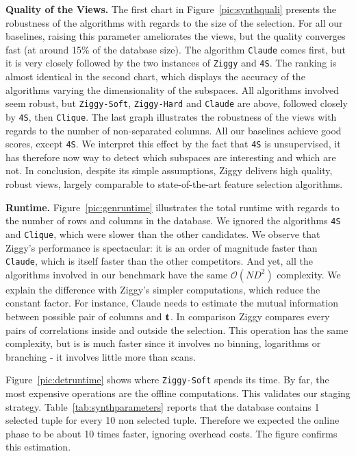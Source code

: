 \textbf{Quality of the Views.} The first chart in Figure~\ref{pic:synthquali}
presents the robustness of the algorithms with regards to the size of the
selection. For all our baselines, raising this parameter ameliorates the views, 
but the quality converges fast (at around 15\% of the database size).  The
algorithm \texttt{Claude} comes first, but it is very closely followed by the
two instances of \texttt{Ziggy} and \texttt{4S}. The ranking is almost
identical in the second chart, which displays the accuracy of the algorithms
varying the dimensionality of the subspaces. All algorithms involved seem
robust, but \texttt{Ziggy-Soft}, \texttt{Ziggy-Hard} and \texttt{Claude}
are above, followed closely by \texttt{4S}, then
\texttt{Clique}. The last graph illustrates the robustness of the views with
regards to the number of non-separated columns.  All our baselines achieve good
scores, except \texttt{4S}. We interpret this effect by the fact that
\texttt{4S} is unsupervised, it has therefore now way to detect which subspaces
are interesting and which are not. In conclusion, despite its simple
assumptions, Ziggy delivers high quality, robust views, largely comparable to
state-of-the-art feature selection algorithms.

\textbf{Runtime.} Figure~\ref{pic:genruntime} illustrates the total runtime
with regards to the number of rows and columns in the database. We ignored the
algorithms \texttt{4S} and \texttt{Clique}, which were slower than the
other candidates. We observe that Ziggy's performance is spectacular: it is
an order of magnitude faster than \texttt{Claude}, which is itself faster than
the other competitors. And yet, all the algorithms involved in our benchmark
have the same $\mathcal{O}(ND^2)$ complexity. We explain the difference with Ziggy's
simpler computations, which reduce the constant factor. For instance, Claude
needs to estimate the mutual information between possible pair of columns and
$\bf{t}$. In comparison Ziggy compares every pairs of correlations inside
and outside the selection. This operation has the same complexity, but is is
much faster since it involves no binning, logarithms or branching - it involves
little more than scans.

Figure~\ref{pic:detruntime} shows where \texttt{Ziggy-Soft} spends its time.
By far, the most expensive operations are the offline computations. This
validates our staging strategy.  Table~\ref{tab:synthparameters} reports that
the database contains 1 selected tuple for every 10 non selected tuple.
Therefore we expected the online phase to be about 10 times faster, ignoring
overhead costs. The figure confirms this estimation.

